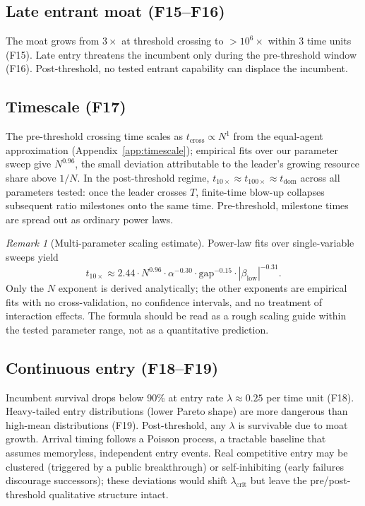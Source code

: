 \documentclass[11pt,letterpaper]{article}
\theoremstyle{plain}
\theoremstyle{definition}
\theoremstyle{remark}
\newtheorem{remark}[theorem]{Remark}
\newcommand{\betaL}{\beta_{\mathrm{low}}}
\newcommand{\tcross}{t_{\mathrm{cross}}}
\begin{document}
\subsection{Late entrant moat (F15--F16)}

The moat grows from $3\times$ at threshold crossing to $> 10^6\times$ within
3 time units (F15).
Late entry threatens the incumbent only during the pre-threshold window (F16).
Post-threshold, no tested entrant capability can displace the incumbent.

\subsection{Timescale (F17)}

The pre-threshold crossing time scales as $\tcross \propto N^{1}$ from
the equal-agent approximation (Appendix~\ref{app:timescale}); empirical
fits over our parameter sweep give $N^{0.96}$, the small deviation
attributable to the leader's growing resource share above $1/N$.
In the post-threshold regime, $t_{10\times} \approx t_{100\times}
\approx t_{\mathrm{dom}}$ across all parameters tested: once the
leader crosses $T$, finite-time blow-up collapses subsequent ratio
milestones onto the same time.
Pre-threshold, milestone times are spread out as ordinary power
laws.

\begin{remark}[Multi-parameter scaling estimate]
Power-law fits over single-variable sweeps yield
\[
  t_{10\times} \approx 2.44 \cdot N^{0.96} \cdot \alpha^{-0.30} \cdot
  \mathrm{gap}^{-0.15} \cdot |\betaL|^{-0.31}.
\]
Only the $N$ exponent is derived analytically; the other exponents are
empirical fits with no cross-validation, no confidence intervals, and
no treatment of interaction effects.
The formula should be read as a rough scaling guide within the tested
parameter range, not as a quantitative prediction.
\end{remark}

\subsection{Continuous entry (F18--F19)}

Incumbent survival drops below 90\% at entry rate
$\lambda \approx 0.25$ per time unit (F18).
Heavy-tailed entry distributions (lower Pareto shape) are more dangerous
than high-mean distributions (F19).
Post-threshold, any $\lambda$ is survivable due to moat growth.
Arrival timing follows a Poisson process, a tractable baseline that assumes
memoryless, independent entry events.
Real competitive entry may be clustered (triggered by a public breakthrough)
or self-inhibiting (early failures discourage successors); these deviations
would shift $\lambda_{\mathrm{crit}}$ but leave the pre/post-threshold
qualitative structure intact.
\end{document}
